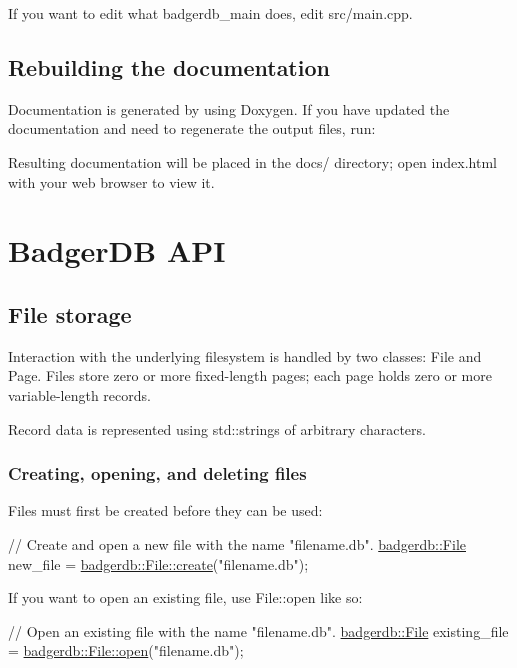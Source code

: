 If you want to edit what {\ttfamily badgerdb\-\_\-main} does, edit {\ttfamily src/main.\-cpp}.\hypertarget{index_documentation_sec}{}\subsection{Rebuilding the documentation}\label{index_documentation_sec}
Documentation is generated by using Doxygen. If you have updated the documentation and need to regenerate the output files, run\-: 
 Resulting documentation will be placed in the {\ttfamily docs/} directory; open {\ttfamily index.\-html} with your web browser to view it.\hypertarget{index_api_sec}{}\section{Badger\-D\-B A\-P\-I}\label{index_api_sec}
\hypertarget{index_storage_sec}{}\subsection{File storage}\label{index_storage_sec}
Interaction with the underlying filesystem is handled by two classes\-: File and Page. Files store zero or more fixed-\/length pages; each page holds zero or more variable-\/length records.

Record data is represented using std\-::strings of arbitrary characters.\hypertarget{index_file_management_sec}{}\subsubsection{Creating, opening, and deleting files}\label{index_file_management_sec}
Files must first be created before they can be used\-: 
\begin{DoxyCode}
\textcolor{comment}{// Create and open a new file with the name "filename.db".}
\hyperlink{classbadgerdb_1_1File}{badgerdb::File} new\_file = \hyperlink{classbadgerdb_1_1File_a1fb708b45103a606f189850d6bf83a0c}{badgerdb::File::create}(\textcolor{stringliteral}{"filename.db"});
\end{DoxyCode}


If you want to open an existing file, use File\-::open like so\-: 
\begin{DoxyCode}
\textcolor{comment}{// Open an existing file with the name "filename.db".}
\hyperlink{classbadgerdb_1_1File}{badgerdb::File} existing\_file = \hyperlink{classbadgerdb_1_1File_a8462afdbd250c0a483ddfbde144c8732}{badgerdb::File::open}(\textcolor{stringliteral}{"filename.db"});
\end{DoxyCode}


